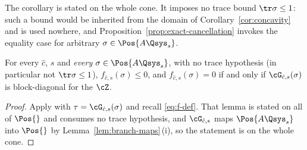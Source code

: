 
The corollary is stated on the whole cone. It imposes no trace bound
$\tr\sigma\le1$: such a bound would be inherited from the domain of
Corollary~\ref{cor:concavity} and is used nowhere, and
Proposition~\ref{prop:exact-cancellation} invokes the equality case for
arbitrary $\sigma\in\Pos{A\Qsys_s}$.

\begin{corollary}\label{cor:f-nonpos}
For every $\hat c$, $s$ and \emph{every} $\sigma\in\Pos{A\Qsys_s}$, with no
trace hypothesis (in particular not $\tr\sigma\le1$),
$f_{\hat c,s}(\sigma)\le0$, and
$f_{\hat c,s}(\sigma)=0$ if and only if $\cG_{\hat c,s}(\sigma)$ is
block-diagonal for the  $\cZ$.
\end{corollary}

\begin{proof}
Apply  with $\tau=\cG_{\hat c,s}(\sigma)$ and
recall \eqref{eq:f-def}. That lemma is stated on all of $\Pos{}$ and
consumes no trace hypothesis, and $\cG_{\hat c,s}$ maps
$\Pos{A\Qsys_s}$ into $\Pos{}$ by Lemma~\ref{lem:branch-maps}\,(i), so the
statement is on the whole cone.
\end{proof}

